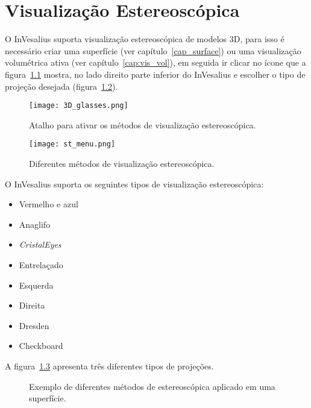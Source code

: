 \chapter{Visualização Estereoscópica}

O InVesalius suporta visualização estereoscópica de modelos 3D, para isso é necessário criar uma superfície (ver capítulo~\ref{cap_surface}) ou uma visualização volumétrica ativa (ver capítulo~\ref{cap:vis_vol}), em seguida ir clicar no ícone que a figura~\ref{fig:ster} mostra, no lado direito parte inferior do InVesalius e escolher o tipo de projeção desejada (figura~\ref{fig:st_menu}). 

\begin{figure}[!htb]
\centering
\texttt{[image: 3D\_glasses.png]}
\caption{Atalho para ativar os métodos de visualização estereoscópica.}
\label{fig:ster}
\end{figure}

\begin{figure}[!htb]
\centering
\texttt{[image: st\_menu.png]}
\caption{Diferentes métodos de visualização estereoscópica.}
\label{fig:st_menu}
\end{figure}

O InVesalius suporta os seguintes tipos de visualização estereoscópica:

\begin{itemize}
	\item Vermelho e azul
	\item Anaglifo
	\item \textit{CristalEyes}
	\item Entrelaçado
	\item Esquerda
	\item Direita
	\item Dresden
	\item Checkboard
\end{itemize}

A figura~\ref{fig:st_surf_methods} apresenta três diferentes tipos de projeções.

\begin{figure}[!htb]
  \centering
   \qquad
   \qquad
  \hfill
  \caption{Exemplo de diferentes métodos de estereoscópica aplicado em uma superfície.}
  \label{fig:st_surf_methods}
\end{figure}